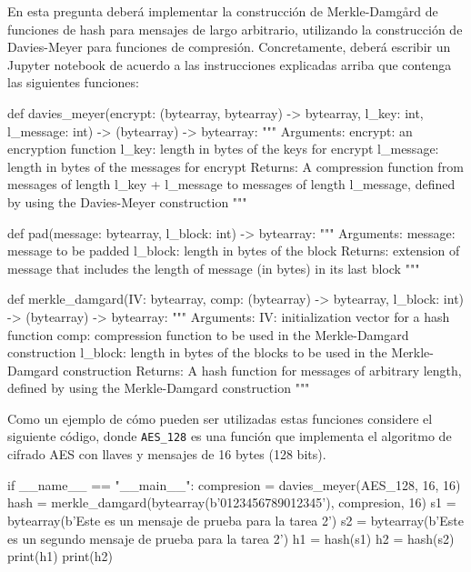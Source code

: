 

En esta pregunta deberá implementar la construcción de Merkle-Damgård
de funciones de hash para mensajes de largo arbitrario, utilizando la
construcción de Davies-Meyer para funciones de
compresión. Concretamente, deberá escribir un Jupyter notebook de
acuerdo a las instrucciones explicadas arriba que contenga las
siguientes funciones:
\begin{python}
def davies_meyer(encrypt: (bytearray, bytearray) -> bytearray,
                 l_key: int, l_message: int) -> (bytearray) -> bytearray:
    """
    Arguments:
      encrypt: an encryption function
      l_key: length in bytes of the keys for encrypt
      l_message: length in bytes of the messages for encrypt
    Returns:
      A compression function from messages of length l_key + l_message to
      messages of length l_message, defined by using the Davies-Meyer
      construction   
    """
\end{python}

\begin{python}
def pad(message: bytearray, l_block: int) -> bytearray:
    """
    Arguments:
      message: message to be padded
      l_block: length in bytes of the block
    Returns:
      extension of message that includes the length of message
      (in bytes) in its last block
    """
\end{python}

\begin{python}
def merkle_damgard(IV: bytearray, comp: (bytearray) -> bytearray,
                   l_block: int) -> (bytearray) -> bytearray:
    """
    Arguments:
      IV: initialization vector for a hash function
      comp: compression function to be used in the Merkle-Damgard
      construction
      l_block: length in bytes of the blocks to be used in the Merkle-Damgard
      construction
    Returns:
      A hash function for messages of arbitrary length, defined by using
      the Merkle-Damgard construction
    """
\end{python}    
Como un ejemplo de cómo pueden ser utilizadas estas funciones
considere el siguiente código, donde \verb+AES_128+ es una función que
implementa el algoritmo de cifrado AES con llaves y mensajes de 16
bytes (128 bits).
\begin{python}
if __name__ == "__main__":
    compresion = davies_meyer(AES_128, 16, 16)
    hash = merkle_damgard(bytearray(b'0123456789012345'), compresion, 16)
    s1 = bytearray(b'Este es un mensaje de prueba para la tarea 2')
    s2 = bytearray(b'Este es un segundo mensaje de prueba para la tarea 2')
    h1 = hash(s1)
    h2 = hash(s2)
    print(h1)
    print(h2)
\end{python}    

